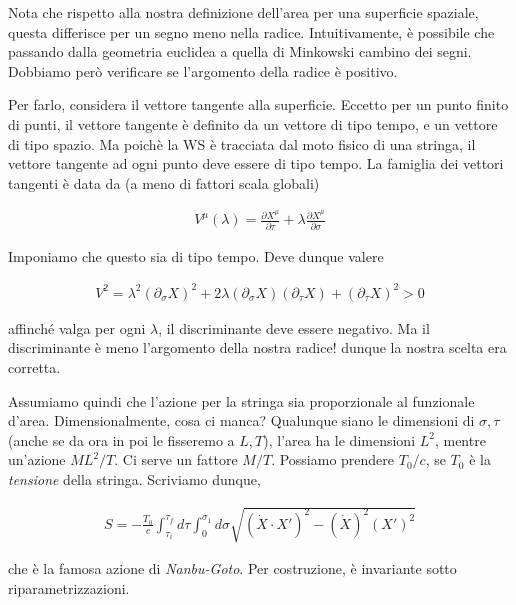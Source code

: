 \documentclass{report}
\begin{document}
Nota che rispetto alla nostra definizione dell'area per una superficie spaziale, questa differisce per un segno meno nella radice. Intuitivamente, è possibile che passando dalla geometria euclidea a quella di Minkowski cambino dei segni. Dobbiamo però verificare se l'argomento della radice è positivo. 

Per farlo, considera il vettore tangente alla superficie. Eccetto per un punto finito di punti, il vettore tangente è definito da un vettore di tipo tempo, e un vettore di tipo spazio. Ma poichè la WS è tracciata dal moto fisico di una stringa, il vettore tangente ad ogni punto deve essere di tipo tempo. La famiglia dei vettori tangenti è data da (a meno di fattori scala globali)

\begin{align}
    V^\mu(\lambda) = \frac{\partial X^\mu}{\partial \tau} + \lambda \frac{\partial X^\mu}{\partial \sigma}
\end{align}

Imponiamo che questo sia di tipo tempo. Deve dunque valere 

\begin{align}
    V^2 = \lambda^2 (\partial_\sigma X)^2 + 2\lambda(\partial_\sigma X)(\partial_\tau X) + (\partial_\tau X)^2 > 0
\end{align}

affinché valga per ogni \(\lambda\), il discriminante deve essere negativo. Ma il discriminante è meno l'argomento della nostra radice! dunque la nostra scelta era corretta. 

Assumiamo quindi che l'azione per la stringa sia proporzionale al funzionale d'area. Dimensionalmente, cosa ci manca? Qualunque siano le dimensioni di \(\sigma, \tau\) (anche se da ora in poi le fisseremo a \(L, T\)), l'area ha le dimensioni \(L^2\), mentre un'azione \(ML^2/T\). Ci serve un fattore \(M/T\). Possiamo prendere \(T_0/c\), se \(T_0\) è la \emph{tensione} della stringa. Scriviamo dunque, 

\begin{align}
    S = -\frac{T_0}{c}\int_{\tau_i}^{\tau_f}d\tau\int_{0}^{\sigma_1}d\sigma \sqrt{(\dot{X}\cdot X')^2 - (\dot{X})^2(X')^2}
\end{align}

che è la famosa azione di \emph{Nanbu-Goto}. Per costruzione, è invariante sotto riparametrizzazioni. 
\end{document}
